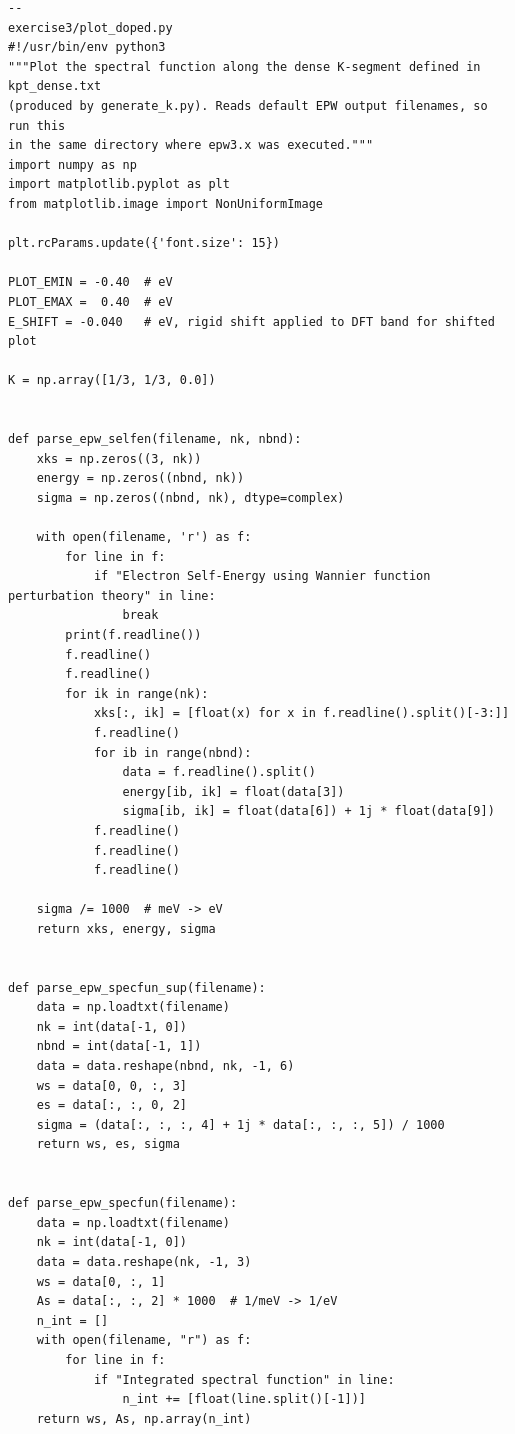 \documentclass[a4paper,11pt,serif]{article}
\begin{document}
\begin{scriptsize}
 \begin{Verbatim}[frame=single]
--                                                                 exercise3/plot_doped.py
#!/usr/bin/env python3
"""Plot the spectral function along the dense K-segment defined in kpt_dense.txt
(produced by generate_k.py). Reads default EPW output filenames, so run this
in the same directory where epw3.x was executed."""
import numpy as np
import matplotlib.pyplot as plt
from matplotlib.image import NonUniformImage

plt.rcParams.update({'font.size': 15})

PLOT_EMIN = -0.40  # eV
PLOT_EMAX =  0.40  # eV
E_SHIFT = -0.040   # eV, rigid shift applied to DFT band for shifted plot

K = np.array([1/3, 1/3, 0.0])


def parse_epw_selfen(filename, nk, nbnd):
    xks = np.zeros((3, nk))
    energy = np.zeros((nbnd, nk))
    sigma = np.zeros((nbnd, nk), dtype=complex)

    with open(filename, 'r') as f:
        for line in f:
            if "Electron Self-Energy using Wannier function perturbation theory" in line:
                break
        print(f.readline())
        f.readline()
        f.readline()
        for ik in range(nk):
            xks[:, ik] = [float(x) for x in f.readline().split()[-3:]]
            f.readline()
            for ib in range(nbnd):
                data = f.readline().split()
                energy[ib, ik] = float(data[3])
                sigma[ib, ik] = float(data[6]) + 1j * float(data[9])
            f.readline()
            f.readline()
            f.readline()

    sigma /= 1000  # meV -> eV
    return xks, energy, sigma


def parse_epw_specfun_sup(filename):
    data = np.loadtxt(filename)
    nk = int(data[-1, 0])
    nbnd = int(data[-1, 1])
    data = data.reshape(nbnd, nk, -1, 6)
    ws = data[0, 0, :, 3]
    es = data[:, :, 0, 2]
    sigma = (data[:, :, :, 4] + 1j * data[:, :, :, 5]) / 1000
    return ws, es, sigma


def parse_epw_specfun(filename):
    data = np.loadtxt(filename)
    nk = int(data[-1, 0])
    data = data.reshape(nk, -1, 3)
    ws = data[0, :, 1]
    As = data[:, :, 2] * 1000  # 1/meV -> 1/eV
    n_int = []
    with open(filename, "r") as f:
        for line in f:
            if "Integrated spectral function" in line:
                n_int += [float(line.split()[-1])]
    return ws, As, np.array(n_int)



\end{Verbatim}
\end{scriptsize}
\end{document}
